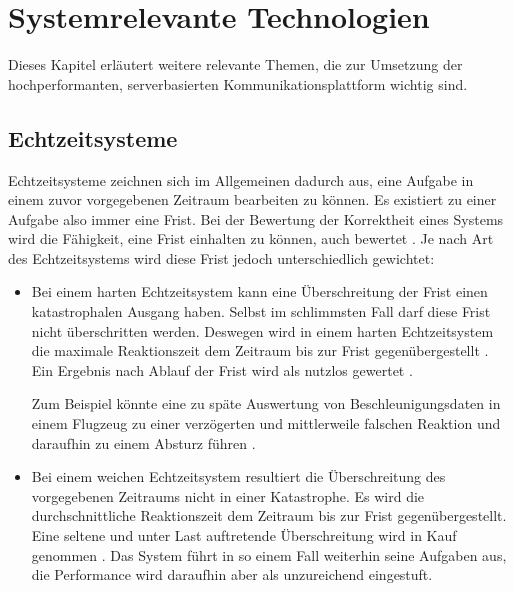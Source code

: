 
\chapter{Systemrelevante Technologien}
\label{com_plattform}

Dieses Kapitel erläutert weitere relevante Themen, die zur Umsetzung der hochperformanten, serverbasierten Kommunikationsplattform wichtig sind.

\section{Echtzeitsysteme}
\label{real_time_systems}
Echtzeitsysteme zeichnen sich im Allgemeinen dadurch aus, eine Aufgabe in einem zuvor vorgegebenen Zeitraum bearbeiten zu können.
Es existiert zu einer Aufgabe also immer eine Frist.
Bei der Bewertung der Korrektheit eines Systems wird die Fähigkeit, eine Frist einhalten zu können, auch bewertet \cite[2]{perf:buttazzo2006soft}.
Je nach Art des Echtzeitsystems wird diese Frist jedoch unterschiedlich gewichtet:

\begin{itemize}
	\item Bei einem harten Echtzeitsystem kann eine Überschreitung der Frist einen katastrophalen Ausgang haben.
	Selbst im schlimmsten Fall darf diese Frist nicht überschritten werden.
	Deswegen wird in einem harten Echtzeitsystem die maximale Reaktionszeit dem Zeitraum bis zur Frist gegenübergestellt \cite[75]{douglass2003real}.
	Ein Ergebnis nach Ablauf der Frist wird als nutzlos gewertet \cite[2]{perf:wang2017real}.
	
	Zum Beispiel könnte eine zu späte Auswertung von Beschleunigungsdaten in einem Flugzeug zu einer verzögerten und mittlerweile falschen Reaktion und daraufhin zu einem Absturz führen \cite[5]{perf:laplante2004real}.
	
	\item Bei einem weichen Echtzeitsystem resultiert die Überschreitung des vorgegebenen Zeitraums nicht in einer Katastrophe.
	Es wird die durchschnittliche Reaktionszeit dem Zeitraum bis zur Frist gegenübergestellt. Eine seltene und unter Last auftretende Überschreitung wird in Kauf genommen \cite[76]{douglass2003real}.
	Das System führt in so einem Fall weiterhin seine Aufgaben aus, die Performance wird daraufhin aber als unzureichend eingestuft.
\end{itemize}

